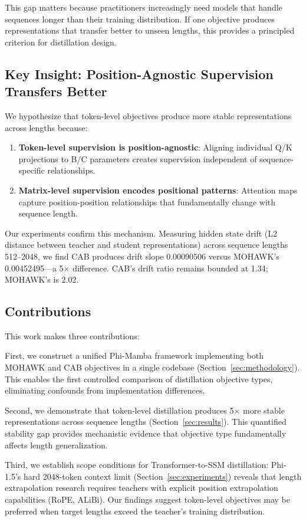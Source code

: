 This gap matters because practitioners increasingly need models that handle sequences longer than their training distribution. If one objective produces representations that transfer better to unseen lengths, this provides a principled criterion for distillation design.

\subsection{Key Insight: Position-Agnostic Supervision Transfers Better}

We hypothesize that token-level objectives produce more stable representations across lengths because:

\begin{enumerate}
    \item \textbf{Token-level supervision is position-agnostic}: Aligning individual Q/K projections to B/C parameters creates supervision independent of sequence-specific relationships.
    \item \textbf{Matrix-level supervision encodes positional patterns}: Attention maps capture position-position relationships that fundamentally change with sequence length.
\end{enumerate}

Our experiments confirm this mechanism. Measuring hidden state drift (L2 distance between teacher and student representations) across sequence lengths 512--2048, we find CAB produces drift slope 0.00090506 versus MOHAWK's 0.00452495---a 5$\times$ difference. CAB's drift ratio remains bounded at 1.34; MOHAWK's is 2.02.

\subsection{Contributions}

This work makes three contributions:

First, we construct a unified Phi-Mamba framework implementing both MOHAWK and CAB objectives in a single codebase (Section~\ref{sec:methodology}). This enables the first controlled comparison of distillation objective types, eliminating confounds from implementation differences.

Second, we demonstrate that token-level distillation produces 5$\times$ more stable representations across sequence lengths (Section~\ref{sec:results}). This quantified stability gap provides mechanistic evidence that objective type fundamentally affects length generalization.

Third, we establish scope conditions for Transformer-to-SSM distillation: Phi-1.5's hard 2048-token context limit (Section~\ref{sec:experiments}) reveals that length extrapolation research requires teachers with explicit position extrapolation capabilities (RoPE, ALiBi). Our findings suggest token-level objectives may be preferred when target lengths exceed the teacher's training distribution.
